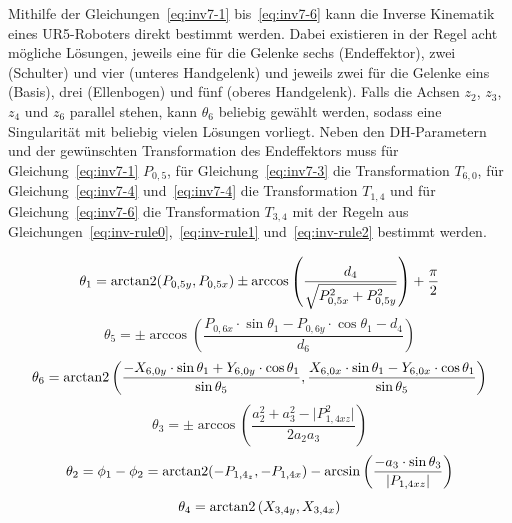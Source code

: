 Mithilfe der Gleichungen~\ref{eq:inv7-1} bis~\ref{eq:inv7-6} kann die Inverse Kinematik eines UR5-Roboters direkt bestimmt werden.
Dabei existieren in der Regel acht mögliche Lösungen, jeweils eine für die Gelenke sechs (Endeffektor), zwei (Schulter) und vier (unteres Handgelenk) und jeweils zwei für die Gelenke eins (Basis), drei (Ellenbogen) und fünf (oberes Handgelenk).
Falls die Achsen $z_2$, $z_3$, $z_4$ und $z_6$ parallel stehen, kann $\theta_6$ beliebig gewählt werden, sodass eine Singularität mit beliebig vielen Lösungen vorliegt.
Neben den DH-Parametern und der gewünschten Transformation des Endeffektors muss für Gleichung~\ref{eq:inv7-1} $P_{0,5}$, für Gleichung~\ref{eq:inv7-3} die Transformation $T_{6,0}$, für Gleichung~\ref{eq:inv7-4} und~\ref{eq:inv7-4} die Transformation $T_{1,4}$ und für Gleichung~\ref{eq:inv7-6} die Transformation $T_{3,4}$ mit der Regeln aus Gleichungen~\ref{eq:inv-rule0},~\ref{eq:inv-rule1} und~\ref{eq:inv-rule2} bestimmt werden.

\begin{equation}
    \theta_1 = \operatorname{arctan2}(P_{0,5y}, P_{0,5x}) \pm \arccos \left( \frac{d_4}{ \sqrt{ P_{0,5x}^2 + P_{0,5y}^2 }  } \right) + \frac{\pi}{2}
    \label{eq:inv7-1}
\end{equation}
\begin{equation}
    \theta_5 = \pm \arccos \left( \frac{ P_{0,6x} \cdot \sin\theta_1 - P_{0,6y} \cdot \cos\theta_1 - d_4 }{ d_6 } \right)
    \label{eq:inv7-2}
\end{equation}
\begin{equation}
    \theta_6 =
    \operatorname{arctan2}\left(
    \frac{
        -X_{6,0y} \cdot \sin\theta_1 + Y_{6,0y} \cdot \cos\theta_1
    }{
        \sin\theta_5
    },
    \frac{
        X_{6,0x} \cdot \sin\theta_1 - Y_{6,0x} \cdot \cos\theta_1
    }{
        \sin\theta_5
    }\right)
    \label{eq:inv7-3}
\end{equation}
\begin{equation}
    \theta_3 = \pm \arccos \left(  \frac{a_2^2 + a_3^2 - \lvert P_{1,4xz}^2 \rvert}{2 a_2 a_3} \right)
    \label{eq:inv7-4}
\end{equation}
\begin{equation}
    \theta_2 = \phi_1 - \phi_2 =
    \operatorname{arctan2}(-P_{1,4_z}, -P_{1,4x}) -
    \arcsin\left( \frac{-a_3\cdot \sin \theta_3}{\lvert P_{1,4xz}\rvert} \right)
    \label{eq:inv7-5}
\end{equation}
\begin{equation}
    \theta_4 = \operatorname{arctan2}\left( X_{3,4y}, X_{3,4x} \right)
    \label{eq:inv7-6}
\end{equation}

